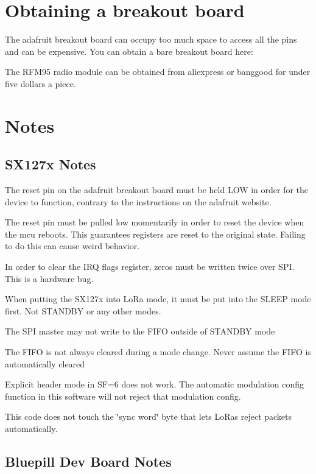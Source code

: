 \section*{Obtaining a breakout board}

The adafruit breakout board can occupy too much space to access all the pins and can be expensive. You can obtain a bare breakout board here\+:

\href{https://oshpark.com/shared_projects/1Yl3TOYu}{\tt }



The R\+F\+M95 radio module can be obtained from aliexpress or banggood for under five dollars a piece.

\section*{Notes}

\subsection*{S\+X127x Notes}


\begin{DoxyItemize}
\item The reset pin on the adafruit breakout board must be held L\+OW in order for the device to function, contrary to the instructions on the adafruit website.
\item The reset pin must be pulled low momentarily in order to reset the device when the mcu reboots. This guarantees registers are reset to the original state. Failing to do this can cause weird behavior.
\item In order to clear the I\+RQ flags register, zeros must be written twice over S\+PI. This is a hardware bug.
\item When putting the S\+X127x into Lo\+Ra mode, it must be put into the S\+L\+E\+EP mode first. Not S\+T\+A\+N\+D\+BY or any other modes.
\item The S\+PI master may not write to the F\+I\+FO outside of S\+T\+A\+N\+D\+BY mode
\item The F\+I\+FO is not always cleared during a mode change. Never assume the F\+I\+FO is automatically cleared
\item Explicit header mode in SF=6 does not work. The automatic modulation config function in this software will not reject that modulation config.
\item This code does not touch the \char`\"{}sync word\char`\"{} byte that lets Lo\+Ras reject packets automatically. \subsection*{Bluepill Dev Board Notes}
\end{DoxyItemize}



